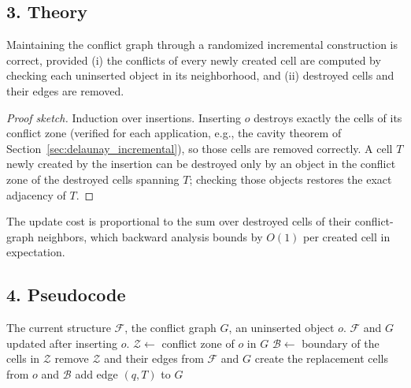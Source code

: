 \subsection{3. Theory}

\begin{theorem}\label{thm:rand_conflict_update}
  Maintaining the conflict graph through a randomized incremental construction
  is correct, provided (i) the conflicts of every newly created cell are
  computed by checking each uninserted object in its neighborhood, and (ii)
  destroyed cells and their edges are removed.
\end{theorem}

\begin{proof}[Proof sketch]
  Induction over insertions. Inserting $o$ destroys exactly the cells of its
  conflict zone (verified for each application, e.g., the cavity theorem of
  Section~\ref{sec:delaunay_incremental}), so those cells are removed
  correctly. A cell $T$ newly created by the insertion can be destroyed only by
  an object in the conflict zone of the destroyed cells spanning $T$; checking
  those objects restores the exact adjacency of $T$.
\end{proof}

The update cost is proportional to the sum over destroyed cells of their
conflict-graph neighbors, which backward analysis bounds by $O(1)$ per created
cell in expectation.

\subsection{4. Pseudocode}

\begin{algorithm}[htbp]
\caption{Conflict-Graph Maintenance}
\label{alg:rand_conflict_update}
\begin{algorithmic}[1]
\Require The current structure $\mathcal{F}$, the conflict graph $G$, an uninserted object $o$.
\Ensure $\mathcal{F}$ and $G$ updated after inserting $o$.
  \State $\mathcal{Z} \gets$ conflict zone of $o$ in $G$
  \State $\mathcal{B} \gets$ boundary of the cells in $\mathcal{Z}$
  \State remove $\mathcal{Z}$ and their edges from $\mathcal{F}$ and $G$
  \State create the replacement cells from $o$ and $\mathcal{B}$
       \State add edge $(q, T)$ to $G$ \EndIf
    \EndFor
  \EndFor
\EndFunction
\end{algorithmic}
\end{algorithm}

